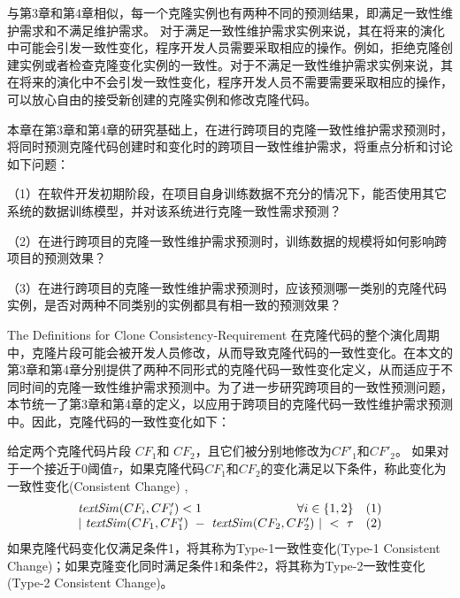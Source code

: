 与第3章和第4章相似，每一个克隆实例也有两种不同的预测结果，即满足一致性维护需求和不满足维护需求。
对于满足一致性维护需求实例来说，其在将来的演化中可能会引发一致性变化，程序开发人员需要采取相应的操作。例如，拒绝克隆创建实例或者检查克隆变化实例的一致性。对于不满足一致性维护需求实例来说，其在将来的演化中不会引发一致性变化，程序开发人员不需要需要采取相应的操作，可以放心自由的接受新创建的克隆实例和修改克隆代码。

本章在第3章和第4章的研究基础上，在进行跨项目的克隆一致性维护需求预测时，将同时预测克隆代码创建时和变化时的跨项目一致性维护需求，将重点分析和讨论如下问题：


（1）在软件开发初期阶段，在项目自身训练数据不充分的情况下，能否使用其它系统的数据训练模型，并对该系统进行克隆一致性需求预测？

（2）在进行跨项目的克隆一致性维护需求预测时，训练数据的规模将如何影响跨项目的预测效果？%

（3）在进行跨项目的克隆一致性维护需求预测时，应该预测哪一类别的克隆代码实例，是否对两种不同类别的实例都具有相一致的预测效果？

{The Definitions for Clone Consistency-Requirement}
在克隆代码的整个演化周期中，克隆片段可能会被开发人员修改，从而导致克隆代码的一致性变化。在本文的第3章和第4章分别提供了两种不同形式的克隆代码一致性变化定义，从而适应于不同时间的克隆一致性维护需求预测中。为了进一步研究跨项目的一致性预测问题，本节统一了第3章和第4章的定义，以应用于跨项目的克隆代码一致性维护需求预测中。因此，克隆代码的一致性变化如下：

\begin{definition}[克隆一致性变化]  
\label{def-change}
给定两个克隆代码片段 $CF_1$和 $CF_2$，且它们被分别地修改为$CF'_1$和$CF'_2$。 如果对于一个接近于0阈值$\tau$，如果克隆代码$CF_1$和$CF_2$的变化满足以下条件，称此变化为一致性变化(Consistent Change) , 
\[
\begin{array}[t]{crl}
 \mathit{textSim}(CF_i, CF'_i) < 1 & \forall i \in \{1,2\} &(1) \\
 \multicolumn{2}{c}{| ~\mathit{textSim}(CF_1,CF'_1)  ~-~ \mathit{textSim}(CF_2,CF'_2) ~| ~< ~ \tau}  & (2)
\end{array}
\]
如果克隆代码变化仅满足条件1，将其称为Type-1一致性变化(Type-1 Consistent Change)；如果克隆变化同时满足条件1和条件2，将其称为Type-2一致性变化(Type-2 Consistent Change)。
\end{definition}


